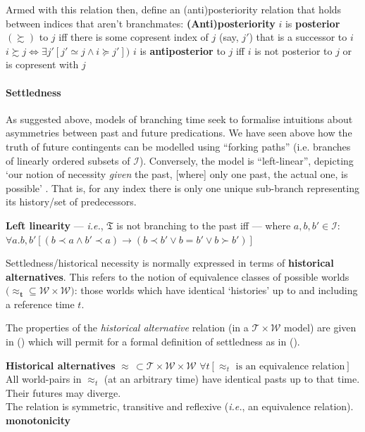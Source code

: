 \documentclass[11pt,dvipsnames]{report}
\begin{document}
Armed with this relation then, \citeauthor{Thomason1980} define an (anti)posteriority relation that holds between indices that aren't branchmates:
\pex \textbf{(Anti)posteriority} \citep[311]{Thomason1980}
\a $ i $ is \textbf{posterior} $ (\boldsymbol\succsim )$ to $ j $ iff there is some copresent index of $ j $ (say, $ j' $) that is a successor to $ i $ \hfill
$i \boldsymbol\succsim j\Leftrightarrow\exists j'[j'\simeq j\wedge i\succcurlyeq j'] )$
\a $ i $ is \textbf{antiposterior} to $ j $ iff $ i $ is not posterior to $ j $ or is copresent with $ j $ \\
\xe

\paragraph{Settledness} As suggested above, models of branching time seek to formalise intuitions about asymmetries between past and future predications. We have seen above how the truth of future contingents can be modelled using ``forking paths'' (i.e. branches of linearly ordered subsets of $ \mathcal I $). Conversely, the model is ``left-linear'', depicting `our notion of necessity \textit{given} the past, [where] only one past, the actual one, is possible' \citep[159]{Burgess1978}. That is, for any index there is only one unique sub-branch representing its history/set of predecessors.\label{par:settledness}

\ex {} \textbf{Left linearity }--- \textit{i.e.}, $ \mathfrak T $ is not branching to the past iff --- where $ a,b,b'\in\mathcal I: $\\
$ \forall a.b,b'[(b\prec a\wedge b'\prec a)\to(b\prec b'\vee b=b'\vee b\succ b')] $\xe

Settledness/historical necessity is normally expressed in terms of \textbf{historical alternatives}. This refers to the notion of equivalence classes of possible worlds $\boldsymbol{(\approx_{t}}\subseteq\mathcal{W\times W})$: those worlds which have identical `histories' up to and including a reference time $t$. 

The properties of the \textit{historical alternative} relation (in a $ \mathcal{T\times W} $ model) are given in (\nextx) which will permit for a formal definition of settledness as in (\anextx).
 
	\pex \textbf{Historical alternatives} $\boldsymbol\approx\,\subset\mathcal{T\times W\times W}$
	\a $\forall t[\approx_t\text{ is an equivalence relation}]$\\
	All world-pairs in $\approx_t$ (at an arbitrary time) have identical pasts up to that time.\\Their futures may diverge.\\
	The relation is symmetric, transitive and reflexive (\textit{i.e.}, an equivalence relation).
	\a \textbf{monotonicity}
	
\end{document}
